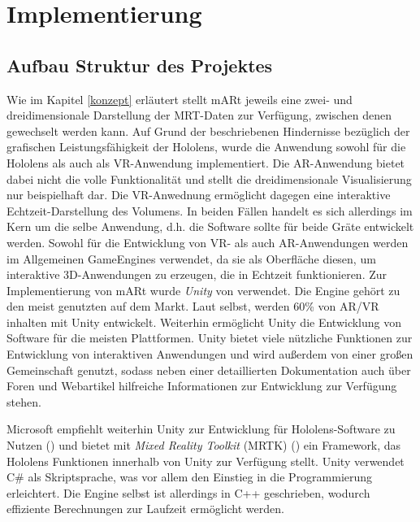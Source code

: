 
\chapter{Implementierung}
\label{implementierung}

\section{Aufbau Struktur des Projektes}

Wie im Kapitel \ref{konzept} erläutert stellt mARt jeweils eine zwei- und dreidimensionale Darstellung der MRT-Daten zur Verfügung, zwischen denen gewechselt werden kann. Auf Grund der beschriebenen Hindernisse bezüglich der grafischen Leistungsfähigkeit der Hololens, wurde die Anwendung sowohl für die Hololens als auch als VR-Anwendung implementiert. Die AR-Anwendung bietet dabei nicht die volle Funktionalität und stellt die dreidimensionale Visualisierung nur beispielhaft dar. Die VR-Anwednung ermöglicht dagegen eine interaktive Echtzeit-Darstellung des Volumens. In beiden Fällen handelt es sich allerdings im Kern um die selbe Anwendung, d.h. die Software sollte für beide Gräte entwickelt werden. 
Sowohl für die Entwicklung von VR- als auch AR-Anwendungen werden im Allgemeinen GameEngines verwendet, da sie als Oberfläche diesen, um interaktive 3D-Anwendungen zu erzeugen, die in Echtzeit funktionieren. 
Zur Implementierung von mARt wurde \textit{Unity} von \citet{unity} verwendet. Die Engine gehört zu den meist genutzten auf dem Markt. Laut \citet{unityRelations} selbst, werden 60\% von AR/VR inhalten mit Unity entwickelt. Weiterhin ermöglicht Unity die Entwicklung von Software für die meisten Plattformen. Unity bietet viele nützliche Funktionen zur Entwicklung von interaktiven Anwendungen und wird außerdem von einer großen  Gemeinschaft genutzt, sodass neben einer detaillierten Dokumentation auch über Foren und Webartikel hilfreiche Informationen zur Entwicklung zur Verfügung stehen.

Microsoft empfiehlt weiterhin Unity zur Entwicklung für Hololens-Software zu Nutzen (\citet{unityHololens}) und bietet mit \textit{Mixed Reality Toolkit} (MRTK) (\citet{holoToolkit}) ein Framework, das Hololens Funktionen innerhalb von Unity zur Verfügung stellt.
Unity verwendet C\# als Skriptsprache, was vor allem den Einstieg in die Programmierung erleichtert. Die Engine selbst ist allerdings in C++ geschrieben, wodurch effiziente Berechnungen zur Laufzeit ermöglicht werden.

